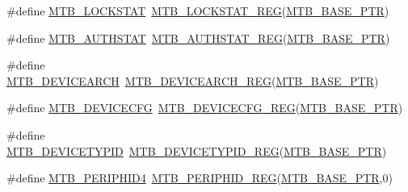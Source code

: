 \begin{DoxyCompactItemize}
\#define \hyperlink{group___m_t_b___register___accessor___macros_gaebecb4529453581f85d19cacab9c0508}{M\+T\+B\+\_\+\+L\+O\+C\+K\+S\+T\+AT}~\hyperlink{group___m_t_b___register___accessor___macros_ga46969ca43e5680eefbd36c829c1194a1}{M\+T\+B\+\_\+\+L\+O\+C\+K\+S\+T\+A\+T\+\_\+\+R\+EG}(\hyperlink{group___m_t_b___peripheral_gadf7f362dfa67354951e6a23ddf08cd73}{M\+T\+B\+\_\+\+B\+A\+S\+E\+\_\+\+P\+TR})
\item 
\#define \hyperlink{group___m_t_b___register___accessor___macros_gaf3db7626003fd4b420efaf3c34278d76}{M\+T\+B\+\_\+\+A\+U\+T\+H\+S\+T\+AT}~\hyperlink{group___m_t_b___register___accessor___macros_gab2cb70e8dbcd3c7e0befc4adc320361c}{M\+T\+B\+\_\+\+A\+U\+T\+H\+S\+T\+A\+T\+\_\+\+R\+EG}(\hyperlink{group___m_t_b___peripheral_gadf7f362dfa67354951e6a23ddf08cd73}{M\+T\+B\+\_\+\+B\+A\+S\+E\+\_\+\+P\+TR})
\item 
\#define \hyperlink{group___m_t_b___register___accessor___macros_ga1335969fc1d5c066fb8d087c6851fb5e}{M\+T\+B\+\_\+\+D\+E\+V\+I\+C\+E\+A\+R\+CH}~\hyperlink{group___m_t_b___register___accessor___macros_gaee07e23608c4ed76b2b145ba15f98cf4}{M\+T\+B\+\_\+\+D\+E\+V\+I\+C\+E\+A\+R\+C\+H\+\_\+\+R\+EG}(\hyperlink{group___m_t_b___peripheral_gadf7f362dfa67354951e6a23ddf08cd73}{M\+T\+B\+\_\+\+B\+A\+S\+E\+\_\+\+P\+TR})
\item 
\#define \hyperlink{group___m_t_b___register___accessor___macros_ga2612f1a6a7623fbe2e55b49a028e227e}{M\+T\+B\+\_\+\+D\+E\+V\+I\+C\+E\+C\+FG}~\hyperlink{group___m_t_b___register___accessor___macros_ga60039245faedb5ba2ff9273bcd6114be}{M\+T\+B\+\_\+\+D\+E\+V\+I\+C\+E\+C\+F\+G\+\_\+\+R\+EG}(\hyperlink{group___m_t_b___peripheral_gadf7f362dfa67354951e6a23ddf08cd73}{M\+T\+B\+\_\+\+B\+A\+S\+E\+\_\+\+P\+TR})
\item 
\#define \hyperlink{group___m_t_b___register___accessor___macros_gae7594a40064338c8e22f729511a20475}{M\+T\+B\+\_\+\+D\+E\+V\+I\+C\+E\+T\+Y\+P\+ID}~\hyperlink{group___m_t_b___register___accessor___macros_gae7ac311868bb09e22c9d90571eb1a174}{M\+T\+B\+\_\+\+D\+E\+V\+I\+C\+E\+T\+Y\+P\+I\+D\+\_\+\+R\+EG}(\hyperlink{group___m_t_b___peripheral_gadf7f362dfa67354951e6a23ddf08cd73}{M\+T\+B\+\_\+\+B\+A\+S\+E\+\_\+\+P\+TR})
\item 
\#define \hyperlink{group___m_t_b___register___accessor___macros_ga9332069b62de88f23a50e30da92309ef}{M\+T\+B\+\_\+\+P\+E\+R\+I\+P\+H\+I\+D4}~\hyperlink{group___m_t_b___register___accessor___macros_ga1c831bceebde1093b9603f4c5d5001fa}{M\+T\+B\+\_\+\+P\+E\+R\+I\+P\+H\+I\+D\+\_\+\+R\+EG}(\hyperlink{group___m_t_b___peripheral_gadf7f362dfa67354951e6a23ddf08cd73}{M\+T\+B\+\_\+\+B\+A\+S\+E\+\_\+\+P\+TR},0)

\end{DoxyCompactItemize}
